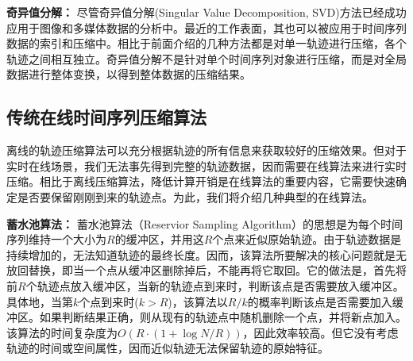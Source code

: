 
\textbf{奇异值分解：}
尽管奇异值分解(Singular Value Decomposition, SVD)方法已经成功应用于图像和多媒体数据的分析中。最近的工作表面，其也可以被应用于时间序列数据的索引和压缩中。相比于前面介绍的几种方法都是对单一轨迹进行压缩，各个轨迹之间相互独立。奇异值分解不是针对单个时间序列对象进行压缩，而是对全局数据进行整体变换，以得到整体数据的压缩结果。

\subsection{传统在线时间序列压缩算法}
离线的轨迹压缩算法可以充分根据轨迹的所有信息来获取较好的压缩效果。但对于实时在线场景，我们无法事先得到完整的轨迹数据，因而需要在线算法来进行实时压缩。相比于离线压缩算法，降低计算开销是在线算法的重要内容，它需要快速确定是否要保留刚刚到来的轨迹点。为此，我们将介绍几种典型的在线算法。

\textbf{蓄水池算法：}
蓄水池算法（Reservior Sampling Algorithm）\cite{Reservoir}的思想是为每个时间序列维持一个大小为$R$的缓冲区，并用这$R$个点来近似原始轨迹。由于轨迹数据是持续增加的，无法知道轨迹的最终长度。因而，该算法所要解决的核心问题就是无放回替换，即当一个点从缓冲区删除掉后，不能再将它取回。它的做法是，首先将前$R$个轨迹点放入缓冲区，当新的轨迹点到来时，判断该点是否需要放入缓冲区。具体地，当第$k$个点到来时($k>R$)，该算法以$R/k$的概率判断该点是否需要加入缓冲区。如果判断结果正确，则从现有的轨迹点中随机删除一个点，并将新点加入。该算法的时间复杂度为$O(R\cdot(1+\log N/R))$，因此效率较高。但它没有考虑轨迹的时间或空间属性，因而近似轨迹无法保留轨迹的原始特征。

